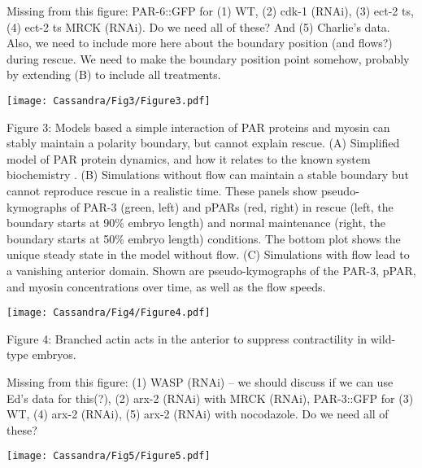 \documentclass[11pt]{article}
\newcommand{\red}[1]{\color{red}#1\normalcolor}
\newcommand{\6}[1]{#1_{\text{6}}}
\newcommand{\3}[1]{#1_{\text{3}}}
\begin{document}
\red{Missing from this figure: PAR-6::GFP for (1) WT, (2) cdk-1 (RNAi), (3) ect-2 ts, (4) ect-2 ts MRCK (RNAi). Do we need all of these? And (5) Charlie's data. Also, we need to include more here about the boundary position (and flows?) during rescue. We need to make the boundary position point somehow, probably by extending (B) to include all treatments.}


\newpage 
\begin{center}
\texttt{[image: Cassandra/Fig3/Figure3.pdf]}
\end{center}


\newpage
Figure 3: Models based a simple interaction of PAR proteins and myosin can stably maintain a polarity boundary, but cannot explain rescue. (A) Simplified model of PAR protein dynamics, and how it relates to the known system biochemistry \citep{lang2017proteins}. (B) Simulations without flow can maintain a stable boundary but cannot reproduce rescue in a realistic time. These panels show pseudo-kymographs of PAR-3 (green, left) and pPARs (red, right) in rescue (left, the boundary starts at 90\% embryo length) and normal maintenance (right, the boundary starts at 50\% embryo length) conditions. The bottom plot shows the unique steady state in the model without flow. (C) Simulations with flow lead to a vanishing anterior domain. Shown are pseudo-kymographs of the PAR-3, pPAR, and myosin concentrations over time, as well as the flow speeds.

\begin{landscape}
\newpage 
\begin{center}
\texttt{[image: Cassandra/Fig4/Figure4.pdf]}
\end{center}
\end{landscape}

\newpage 
Figure 4: Branched actin acts in the anterior to suppress contractility in wild-type embryos. 

\red{Missing from this figure: (1) WASP (RNAi) -- we should discuss if we can use Ed's data for this(?), (2) arx-2 (RNAi) with MRCK (RNAi), PAR-3::GFP for (3) WT, (4) arx-2 (RNAi), (5) arx-2 (RNAi) with nocodazole. Do we need all of these?}

\newpage 
\begin{center}
\texttt{[image: Cassandra/Fig5/Figure5.pdf]}
\end{center}
\end{document}
